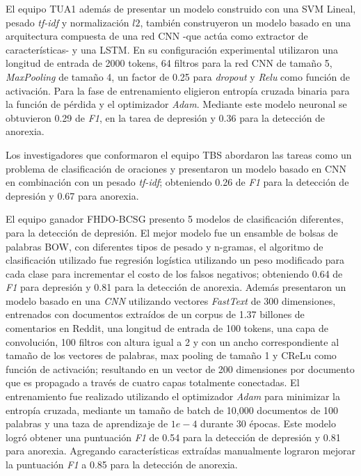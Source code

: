El equipo TUA1 \citep{liu2018tua1} además de presentar un modelo construido con una SVM Lineal, pesado \textit{tf-idf} y normalización $l2$, también construyeron un modelo basado en una arquitectura compuesta de una red CNN -que actúa como extractor de características- y una LSTM. En su configuración experimental utilizaron una longitud de entrada de 2000 tokens, 64 filtros para la red CNN de tamaño 5, \textit{MaxPooling} de tamaño 4, un factor de 0.25 para \textit{dropout} y \textit{Relu} como función de activación. Para la fase de entrenamiento eligieron entropía cruzada binaria para la función de pérdida y el optimizador \textit{Adam}. Mediante este modelo neuronal se obtuvieron 0.29 de \textit{F1}, en la tarea de depresión y 0.36 para la detección de anorexia. 

Los investigadores que conformaron el equipo TBS \citep{wang2018neural} abordaron las tareas como un problema de clasificación de oraciones y presentaron un modelo basado en CNN en combinación con un pesado \textit{tf-idf}; obteniendo 0.26 de \textit{F1} para la detección de depresión y 0.67 para anorexia.

El equipo ganador \citep{trotzek2018word} FHDO-BCSG presento 5 modelos de clasificación diferentes, para la detección de depresión. El mejor modelo fue un ensamble de bolsas de palabras BOW, con diferentes tipos de pesado y n-gramas, el algoritmo de clasificación utilizado fue regresión logística utilizando un peso modificado para cada clase para incrementar el costo de los falsos negativos; obteniendo 0.64 de \textit{F1} para depresión y 0.81 para la detección de anorexia. 
Además presentaron un modelo basado en una \textit{CNN} utilizando vectores \textit{FastText} de 300 dimensiones, entrenados con documentos extraídos de un corpus de 1.37 billones de comentarios en Reddit, una longitud de entrada de 100 tokens, una capa de convolución, 100 filtros con altura igual a 2 y con un ancho correspondiente al tamaño de los vectores de palabras, max pooling de tamaño 1 y CReLu como función de activación; resultando en un vector de 200 dimensiones por documento que es propagado a través de cuatro capas totalmente conectadas. El entrenamiento fue realizado utilizando el optimizador \textit{Adam} para minimizar la entropía cruzada, mediante un tamaño de batch de 10,000 documentos de 100 palabras  y una taza de aprendizaje de $1e-4$ durante 30 épocas. Este modelo logró obtener una puntuación \textit{F1} de 0.54 para la detección de depresión y 0.81 para anorexia. Agregando características extraídas manualmente lograron mejorar la puntuación \textit{F1} a 0.85 para la detección de anorexia.

